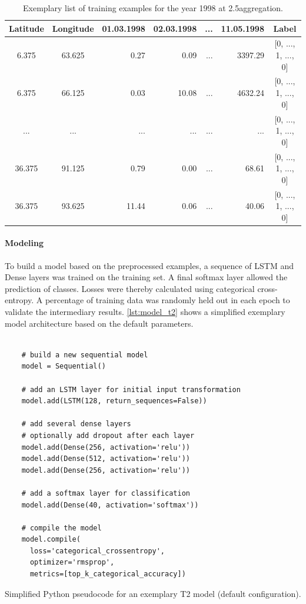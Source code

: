 \begin{table}[h!]
  \centering
  \begin{tabular}{ccrrrr|c}
    \toprule
    \textbf{Latitude} & \textbf{Longitude} & \textbf{01.03.1998} & \textbf{02.03.1998} & \textbf{...} & \textbf{11.05.1998} & \textbf{Label} \\
    \midrule
    6.375 & 63.625 & 0.27 & 0.09 & ... & 3397.29 & [0, ..., 1, ..., 0] \\
    6.375 & 66.125 & 0.03 & 10.08 & ... & 4632.24 & [0, ..., 1, ..., 0] \\
    ... & ... & ... & ... & ... & ... & [0, ..., 1, ..., 0] \\
    36.375 & 91.125 & 0.79 & 0.00 & ... & 68.61 & [0, ..., 1, ..., 0] \\
    36.375 & 93.625 & 11.44 & 0.06 & ... & 40.06 & [0, ..., 1, ..., 0] \\
    \bottomrule
  \end{tabular}
  \caption{Exemplary list of training examples for the year 1998 at 2.5\degree aggregation.}
  \label{tab:nn_t2_data}
\end{table}

\paragraph{Modeling}
\label{ssst:nn_t2_model}
To build a model based on the preprocessed examples, a sequence of LSTM and Dense layers was trained on the training set. A final softmax layer allowed the prediction of classes. Losses were thereby calculated using categorical cross-entropy. A percentage of training data was randomly held out in each epoch to validate the intermediary results. \cref{lst:model_t2} shows a simplified exemplary model architecture based on the default parameters.

\begin{listing}[h!]
  \begin{verbatim}

    # build a new sequential model
    model = Sequential()

    # add an LSTM layer for initial input transformation
    model.add(LSTM(128, return_sequences=False))

    # add several dense layers
    # optionally add dropout after each layer
    model.add(Dense(256, activation='relu'))
    model.add(Dense(512, activation='relu'))
    model.add(Dense(256, activation='relu'))

    # add a softmax layer for classification
    model.add(Dense(40, activation='softmax'))

    # compile the model
    model.compile(
      loss='categorical_crossentropy',
      optimizer='rmsprop',
      metrics=[top_k_categorical_accuracy])

  \end{verbatim}
  \caption{Simplified Python pseudocode for an exemplary T2 model (default configuration).}
  \label{lst:model_t2}
\end{listing}

